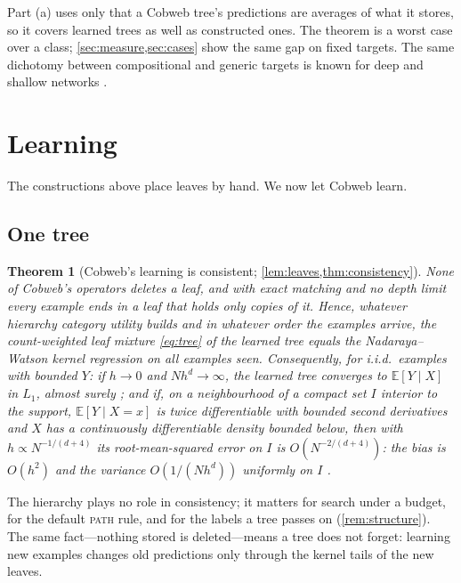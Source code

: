 \documentclass[11pt]{article}
\newtheorem{theorem}{Theorem}
\theoremstyle{definition}
\theoremstyle{remark}
\newcommand{\E}{\mathbb{E}}
\begin{document}
Part (a) uses only that a Cobweb tree's predictions are averages of what it stores, so it
covers learned trees as well as constructed ones.  The theorem is a worst case over a class;
\cref{sec:measure,sec:cases} show the same gap on fixed targets.  The same dichotomy between compositional and generic targets is
known for deep and shallow networks \citep{poggio2017}.

\section{Learning}\label{sec:learn-main}

The constructions above place leaves by hand.  We now let Cobweb learn.

\subsection{One tree}

\begin{theorem}[Cobweb's learning is consistent; \cref{lem:leaves,thm:consistency}]\label{thm:learn-tree}
None of Cobweb's operators deletes a leaf, and with exact matching and no depth limit
every example ends in a leaf that holds only copies of it.  Hence, whatever
hierarchy category utility builds and in whatever order the examples arrive, the
count-weighted leaf mixture \eqref{eq:tree} of the learned tree \emph{equals} the
Nadaraya--Watson kernel regression on all examples seen.  Consequently, for i.i.d.\ examples with bounded $Y$:
if $h\to0$ and $Nh^d\to\infty$, the learned tree converges to $\E[Y\mid X]$ in $L_1$, almost
surely \citep{devroye1989}; and if, on a neighbourhood of a compact set $I$ interior to the
support, $\E[Y\mid X=x]$ is twice differentiable with bounded second derivatives and $X$ has a
continuously differentiable density bounded below, then with $h\propto N^{-1/(d+4)}$ its
root-mean-squared error on $I$ is $O(N^{-2/(d+4)})$: the bias is $O(h^2)$ and the variance
$O(1/(Nh^d))$ uniformly on $I$ \citep{wand1995,gyorfi2002}.
\end{theorem}

The hierarchy plays no role in consistency; it matters for search under a budget, for the
default \textsc{path} rule, and for the labels a tree passes on (\cref{rem:structure}).  The
same fact---nothing stored is deleted---means a tree does not forget: learning new examples
changes old predictions only through the kernel tails of the new leaves.
\end{document}

